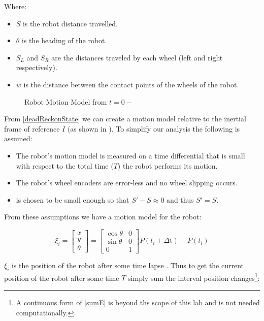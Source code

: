 \documentclass[main.tex]{subfiles}
\begin{document}
Where:
\begin{itemize}
\item $S$ is the robot distance travelled.
\item $\theta$ is the heading of the robot.
\item $S_L$ and $S_R$ are the distances traveled by each wheel (left and right
respectively).
\item $w$ is the distance between the contact points of the
wheels of the robot.
\end{itemize}

\begin{figure}[H]
	\begin{center}
	
	\end{center}
	\caption{Robot Motion Model from $t=0 -$ \delt}
	\label{fig:2wrMotion}
\end{figure}


From \eqref{deadReckonState} we can create a motion model relative to the
inertial frame of reference $I$ (as shown in ). To simplify
our analysis the following is assumed:

\begin{itemize}
\item The robot's motion model is measured on a time differential \delt that
is small with respect to the total time ($T$) the robot performs its motion. 
\item The robot's wheel encoders are error-less and no wheel slipping occurs.
\item \delt is chosen to be small enough so that $S\mathrm{'}-S \approx 0$ and
thus $S\mathrm{'} = S$.
\end{itemize}

From these assumptions we have a motion model for the robot:

\begin{equation}
\label{eq:motionState}
\xi_{i} = 
\begin{bmatrix}
x \\ y \\ \theta
\end{bmatrix}
=
\begin{bmatrix}
\cos{\theta} & 0\\
\sin{\theta} & 0\\
0 & 1
\end{bmatrix}
P(t_i+\Delta\mathrm{t})-P(t_i)
\end{equation}

$\xi_{i}$ is the position of the robot after some time lapse \delt. Thus to get
the current position of the robot after some time $T$ simply sum the interval
position changes\footnote{A continuous form of \eqref{sumE} is beyond ths scope
of this lab and is not needed computationally.}: 
\end{document}
